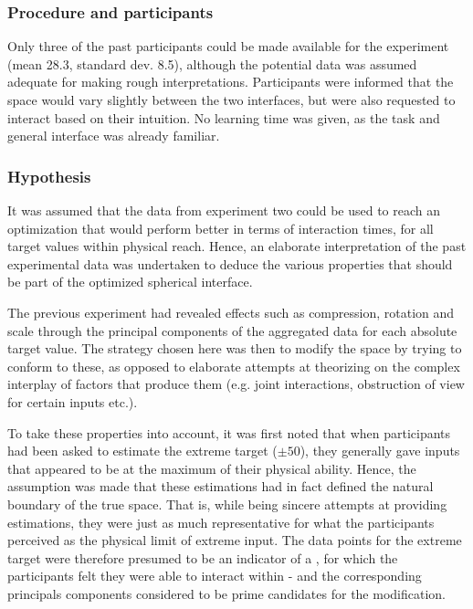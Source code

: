 \subsubsection{Procedure and participants}


Only three of the past participants could be made available for the experiment (mean 28.3, standard dev. 8.5), although the potential data was assumed adequate for making rough interpretations. Participants were informed that the space would vary slightly between the two interfaces, but were also requested to interact based on their intuition. No learning time was given, as the task and general interface was already familiar.

	

\subsubsection{Hypothesis}

It was assumed that the data from experiment two could be used to reach an optimization that would perform better in terms of interaction times, for all target values within physical reach. Hence, an elaborate interpretation of the past experimental data was undertaken to deduce the various properties that should be part of the optimized spherical interface.


The previous experiment had revealed effects such as compression, rotation and scale through the principal components of the aggregated data for  each absolute target value. The strategy chosen here was then to  modify the space by trying to conform to these, as opposed to elaborate attempts at theorizing on the complex interplay of factors that produce them (e.g. joint interactions, obstruction of view for certain inputs etc.).

To take these properties into account, it was first noted that when participants had been asked to estimate the extreme target ($\pm50$), they generally gave inputs that appeared to be at the maximum of their physical ability. Hence, the assumption was made that these estimations had in fact defined the natural boundary of the true space. That is, while being sincere attempts at providing estimations, they were just as much representative for what the participants perceived as the physical limit of extreme input. The data points for the extreme target were therefore presumed to be an indicator of a , for which the participants felt they were able to interact within - and the corresponding principals components considered to be prime candidates for the modification.%

